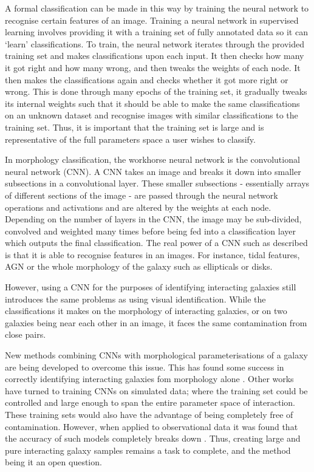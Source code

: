 A formal classification can be made in this way by training the neural network to recognise certain features of an image. Training a neural network in supervised learning involves providing it with a training set of fully annotated data so it can `learn' classifications. To train, the neural network iterates through the provided training set and makes classifications upon each input. It then checks how many it got right and how many wrong, and then tweaks the weights of each node. It then makes the classifications again and checks whether it got more right or wrong. This is done through many epochs of the training set, it gradually tweaks its internal weights such that it should be able to make the same classifications on an unknown dataset and recognise images with similar classifications to the training set. Thus, it is important that the training set is large and is representative of the full parameters space a user wishes to classify.

In morphology classification, the workhorse neural network is the convolutional neural network (CNN). A CNN takes an image and breaks it down into smaller subsections in a convolutional layer. These smaller subsections - essentially arrays of different sections of the image - are passed through the neural network operations and activations and are altered by the weights at each node. Depending on the number of layers in the CNN, the image may be sub-divided, convolved and weighted many times before being fed into a classification layer which outputs the final classification. The real power of a CNN such as described is that it is able to recognise features in an images. For instance, tidal features, AGN or the whole morphology of the galaxy such as ellipticals or disks. 

However, using a CNN for the purposes of identifying interacting galaxies still introduces the same problems as using visual identification. While the classifications it makes on the morphology of interacting galaxies, or on two galaxies being near each other in an image, it faces the same contamination from close pairs.

New methods combining CNNs with morphological parameterisations of a galaxy are being developed to overcome this issue. This has found some success in correctly identifying interacting galaxies fom morphology alone \citep{2023ApJ...958...96R}. Other works have turned to training CNNs on simulated data; where the training set could be controlled and large enough to span the entire parameter space of interaction. These training sets would also have the advantage of being completely free of contamination. However, when applied to observational data it was found that the accuracy of such models completely breaks down \citep{2019MNRAS.490.5390B, 2020A&C....3200390C}. Thus, creating large and pure interacting galaxy samples remains a task to complete, and the method being it an open question.

